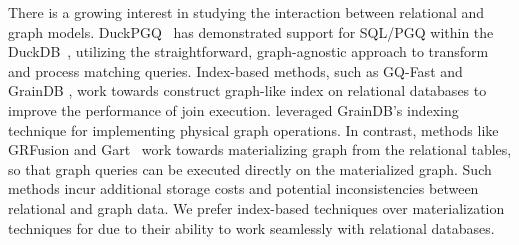  There is a growing interest in studying the interaction between relational and graph models.
DuckPGQ~\cite{DuckPGQ,DuckPGQ-VLDB} has demonstrated support for SQL/PGQ within the DuckDB~\cite{duckdb}, utilizing the straightforward, graph-agnostic approach to transform and process matching queries.
Index-based methods, such as GQ-Fast \cite{gqfast} and GrainDB \cite{graindb}, work towards construct graph-like index on relational databases to improve the performance of join execution. \name leveraged GrainDB's indexing technique for implementing physical graph operations. In contrast, methods like GRFusion \cite{GRFusion} and Gart~\cite{gart} work towards materializing graph from the relational tables,
so that graph queries can be executed directly on the materialized graph. Such methods incur additional storage costs and potential inconsistencies between relational and graph data.
We prefer index-based techniques over materialization techniques for due to their ability to work seamlessly with relational databases. %






